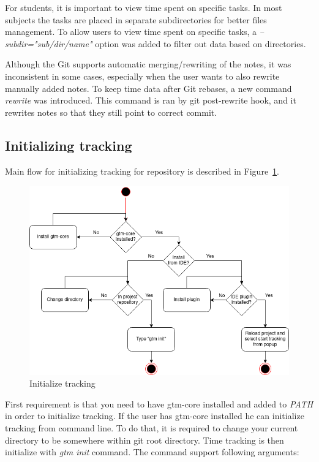 For students, it is important to view time spent on specific tasks.
In most subjects the tasks are placed in separate subdirectories for better files management.
To allow users to view time spent on specific tasks, a \textit{--subdir="sub/dir/name"} option was added to filter out
data based on directories.

Although the Git supports automatic merging/rewriting of the notes, it was inconsistent in some cases, especially when the user
wants to also rewrite manually added notes.
To keep time data after Git rebases, a new command \textit{rewrite} was introduced.
This command is ran by git post-rewrite hook, and it rewrites notes so that they still point to correct commit.

\subsection{Initializing tracking}\label{subsec:init-tracking}
Main flow for initializing tracking for repository is described in Figure~\ref{fig:init-tracking}.
\begin{figure}[h]
    \includegraphics[width=\textwidth]{figures/init_tracking}
    \caption{Initialize tracking}
    \label{fig:init-tracking}
\end{figure}

First requirement is that you need to have gtm-core installed and added to \textit{PATH} in order to initialize tracking.
If the user has gtm-core installed he can initialize tracking from command line.
To do that, it is required to change your current directory to be somewhere within git root directory.
Time tracking is then initialize with \textit{gtm init} command.
The command support following arguments:

